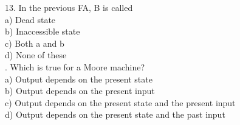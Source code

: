 \documentclass[a4,9pt]{beamer}
\begin{document}
\begin{frame}
13. In the previous FA, B is called\\
\hspace*{0.5cm} a) Dead state \\
\hspace*{0.5cm} b) Inaccessible state \\
\hspace*{0.5cm} c) Both a and b \\
\hspace*{0.5cm} d) None of these \\

\vspace*{0.2cm}
. Which is true for a Moore machine?\\
\hspace*{0.5cm} a) Output depends on the present state \\
\hspace*{0.5cm} b) Output depends on the present input \\
\hspace*{0.5cm} c) Output depends on the present state and the present input \\
\hspace*{0.5cm} d) Output depends on the present state and the past input \\
\end{frame}
\end{document}
